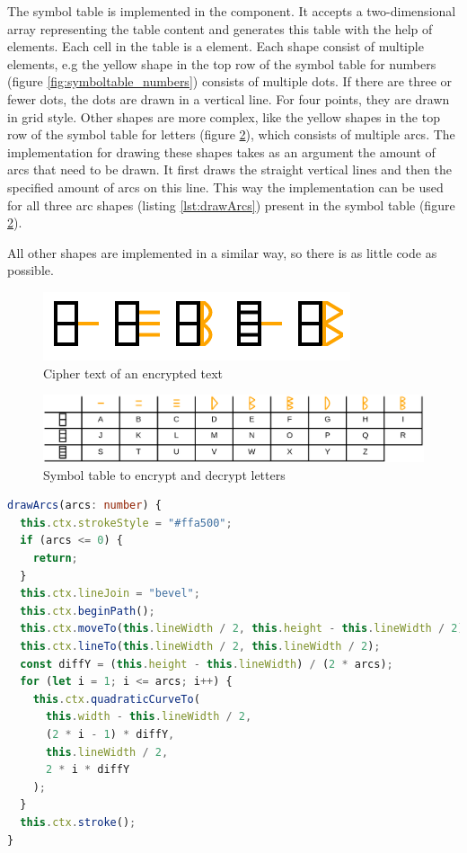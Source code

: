 The symbol table is implemented in the  component. It accepts a two-dimensional array representing the table content and generates this table with the help of  elements. Each cell in the table is a  element. Each shape consist of multiple elements, e.g the yellow shape in the top row of the symbol table for numbers (figure \ref{fig:symboltable_numbers}) consists of multiple dots. If there are three or fewer dots, the dots are drawn in a vertical line. For four points, they are drawn in grid style. Other shapes are more complex, like the yellow shapes in the top row of the symbol table for letters (figure \ref{fig:symboltable_letters}), which consists of multiple arcs. The implementation for drawing these shapes takes as an argument the amount of arcs that need to be drawn. It first draws the straight vertical lines and then the specified amount of arcs on this line. This way the implementation can be used for all three arc shapes (listing \ref{lst:drawArcs}) present in the symbol table (figure \ref{fig:symboltable_letters}).

All other shapes are implemented in a similar way, so there is as little code as possible.

\begin{figure} 
    \centering
    \includegraphics[width=0.4 \columnwidth]{figures/cipher_text.png}
    \caption{Cipher text of an encrypted text} 
    \label{fig:cipher_text} 
\end{figure}

\begin{figure} 
    \centering
    \includegraphics[width=1.0 \columnwidth]{figures/symboltable_letters.png}
    \caption{Symbol table to encrypt and decrypt letters} 
    \label{fig:symboltable_letters} 
\end{figure}

\begin{lstlisting}[language=TypeScript,caption={Implementation of drawing a variable amount of arc symbols},label={lst:drawArcs}]
drawArcs(arcs: number) {
  this.ctx.strokeStyle = "#ffa500";
  if (arcs <= 0) {
    return;
  }
  this.ctx.lineJoin = "bevel";
  this.ctx.beginPath();
  this.ctx.moveTo(this.lineWidth / 2, this.height - this.lineWidth / 2);
  this.ctx.lineTo(this.lineWidth / 2, this.lineWidth / 2);
  const diffY = (this.height - this.lineWidth) / (2 * arcs);
  for (let i = 1; i <= arcs; i++) {
    this.ctx.quadraticCurveTo(
      this.width - this.lineWidth / 2,
      (2 * i - 1) * diffY,
      this.lineWidth / 2,
      2 * i * diffY
    );
  }
  this.ctx.stroke();
}
\end{lstlisting}

